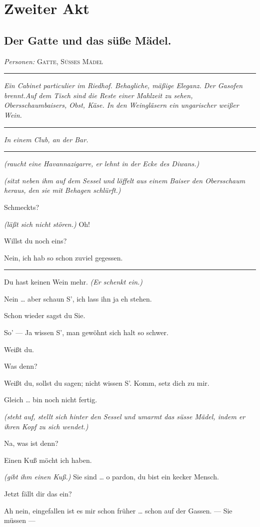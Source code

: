 \documentclass[
	final,
	a4paper,
	ngerman,
	mpinclude = true, %
	twoside = true,
	open = right,
	cleardoublepage = plain,
	DIV = 13,
	BCOR = 1cm,
	titlepage = firstiscover,
	]{scrbook}
\newcommand{\act}{\chapter}
\newcommand{\scene}{\section}
\newcommand{\direction}[1]{\textit{(#1)}}
\newcommand{\setting}[1]{\vspace{-0.5\baselineskip}\centering\textit{#1}}
\newenvironment{deletion}{%
		\vspace{0.25\baselineskip}
		\hrule
		\vspace{0.25\baselineskip}
		\color{darkgray}
	}{
		\color{black}
		\vspace{0.25\baselineskip}
		\hrule 
		\vspace{0.25\baselineskip}
	}
\newcommand{\characterlist}[1]{{\begin{center}\textit{Personen:} #1\end{center}}}
\newcommand{\thecharacter}[1]{\textup{\textsc{#1}}\xspace}
\newcommand{\thegatte}{\thecharacter{Gatte}}
\newcommand{\thesuesse}{\thecharacter{Süßes Mädel}}
\newcommand{\character}[1]{\item[#1:]}
\newcommand{\gatte}{\character{\thegatte}}
\newcommand{\suesse}{\character{\thesuesse}}
\begin{document}
\act{Zweiter Akt}

\scene{Der Gatte und das süße Mädel.}
\characterlist{\thegatte, \thesuesse}
\begin{deletion}
\setting{Ein Cabinet particulier im Riedhof. Behagliche, mäßige Eleganz. Der Gasofen brennt.Auf dem Tisch sind die Reste einer Mahlzeit zu sehen, Obersschaumbaisers, Obst, Käse. In den Weingläsern ein ungarischer weißer Wein.}
\end{deletion}
\setting{In einem Club, an der Bar.}
\begin{play}
	\begin{deletion}
	\gatte
	\direction{raucht eine Havannazigarre, er lehnt in der Ecke des Diwans.}

	\suesse
	\direction{sitzt neben ihm auf dem Sessel und löffelt aus einem Baiser den Obersschaum heraus, den sie mit Behagen schlürft.}

	\gatte
	Schmeckts?

	\suesse
	\direction{läßt sich nicht stören.} Oh!

	\gatte
	Willst du noch eins?

	\suesse
	Nein, ich hab so schon zuviel gegessen.
	\end{deletion}

	\gatte
	Du hast keinen Wein mehr. \direction{Er schenkt ein.}

	\suesse
	Nein \ldots{} aber schaun S', ich lass ihn ja eh stehen.

	\gatte
	Schon wieder sagst du Sie.

	\suesse
	So' --- Ja wissen S', man gewöhnt sich halt so schwer.

	\gatte
	Weißt du.

	\suesse
	Was denn?

	\gatte
	Weißt du, sollst du sagen; nicht wissen S'. Komm, setz dich zu mir.

	\suesse
	Gleich \ldots{} bin noch nicht fertig.

	\gatte
	\direction{steht auf, stellt sich hinter den Sessel und umarmt das süsse Mädel, indem er ihren Kopf zu sich wendet.}

	\suesse
	Na, was ist denn?

	\gatte
	Einen Kuß möcht ich haben.

	\suesse
	\direction{gibt ihm einen Kuß.} Sie sind \ldots{} o pardon, du bist ein kecker Mensch.

	\gatte
	Jetzt fällt dir das ein?

	\suesse
	Ah nein, eingefallen ist es mir schon früher \ldots{} schon auf der Gassen. --- Sie müssen ---


\end{play}
\end{document}
